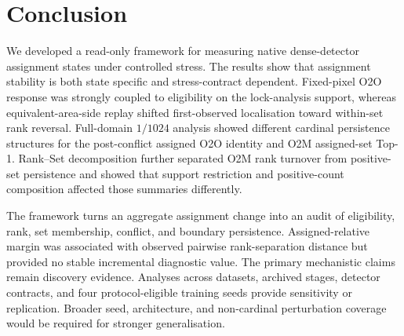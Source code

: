 \section{Conclusion}

We developed a read-only framework for measuring native dense-detector assignment states under controlled stress. The results show that assignment stability is both state specific and stress-contract dependent. Fixed-pixel O2O response was strongly coupled to eligibility on the lock-analysis support, whereas equivalent-area-side replay shifted first-observed localisation toward within-set rank reversal. Full-domain $1/1024$ analysis showed different cardinal persistence structures for the post-conflict assigned O2O identity and O2M assigned-set Top-1. Rank--Set decomposition further separated O2M rank turnover from positive-set persistence and showed that support restriction and positive-count composition affected those summaries differently.

The framework turns an aggregate assignment change into an audit of eligibility, rank, set membership, conflict, and boundary persistence. Assigned-relative margin was associated with observed pairwise rank-separation distance but provided no stable incremental diagnostic value. The primary mechanistic claims remain discovery evidence. Analyses across datasets, archived stages, detector contracts, and four protocol-eligible training seeds provide sensitivity or replication. Broader seed, architecture, and non-cardinal perturbation coverage would be required for stronger generalisation.
